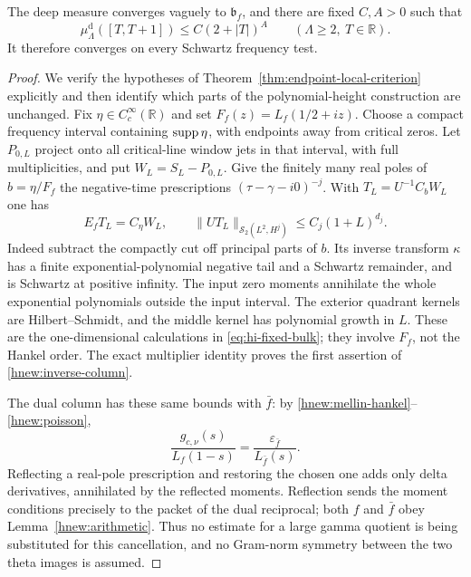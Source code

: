 \begin{proposition}
\label{hnew:deep-upper}
The deep measure converges vaguely to $\mathfrak b_f$, and
there are fixed $C,A>0$ such that
\begin{equation}\label{hnew:uniform-mass}
 \mu_\Lambda^{\mathrm d}([T,T+1])
             \le C(2+|T|)^A\qquad(\Lambda\ge2,\ T\in\mathbb R).
\end{equation}
It therefore converges on every Schwartz frequency test.
\end{proposition}
\begin{proof}
We verify the hypotheses of
Theorem~\ref{thm:endpoint-local-criterion} explicitly and then
identify which parts of the polynomial-height construction are
unchanged.  Fix $\eta\in C_c^\infty(\mathbb R)$ and set
$F_f(z)=L_f(1/2+iz)$.  Choose a compact frequency interval
containing $\operatorname{supp}\eta$, with endpoints away from critical zeros.
Let $P_{0,L}$ project onto all critical-line window jets in that
interval, with full multiplicities, and put $W_L=S_L-P_{0,L}$.
Give the finitely many real poles of $b=\eta/F_f$ the
negative-time prescriptions $(\tau-\gamma-i0)^{-j}$.
With $T_L=U^{-1}C_bW_L$ one has
\begin{equation}\label{hnew:inverse-column}
 E_fT_L=C_\eta W_L,\qquad
 \|UT_L\|_{\mathcal S_2(L^2,H^j)}\le C_j(1+L)^{d_j}.
\end{equation}
Indeed subtract the compactly cut off principal parts of $b$.
Its inverse transform $\kappa$ has a finite exponential-polynomial
negative tail and a Schwartz remainder, and is Schwartz at
positive infinity.  The input zero moments annihilate the whole
exponential polynomials outside the input interval.
The exterior quadrant kernels are Hilbert--Schmidt, and the
middle kernel has polynomial growth in $L$.
These are the one-dimensional calculations in
\eqref{eq:hi-fixed-bulk}; they involve $F_f$, not the Hankel order.
The exact multiplier identity proves the first assertion of
\eqref{hnew:inverse-column}.

The dual column has these same bounds with $\bar f$: by
\eqref{hnew:mellin-hankel}--\eqref{hnew:poisson},
\begin{equation}\label{hnew:dual-reciprocal}
 \frac{g_{c,\nu}(s)}{L_f(1-s)}
                        =\frac{\varepsilon_{\bar f}}{L_{\bar f}(s)}.
\end{equation}
Reflecting a real-pole prescription and restoring the chosen one
adds only delta derivatives, annihilated by the reflected moments.
Reflection sends the moment conditions precisely to the packet
of the dual reciprocal; both $f$ and $\bar f$ obey
Lemma~\ref{hnew:arithmetic}.  Thus no estimate for a large gamma
quotient is being substituted for this cancellation, and no
Gram-norm symmetry between the two theta images is assumed.


\end{proof}

